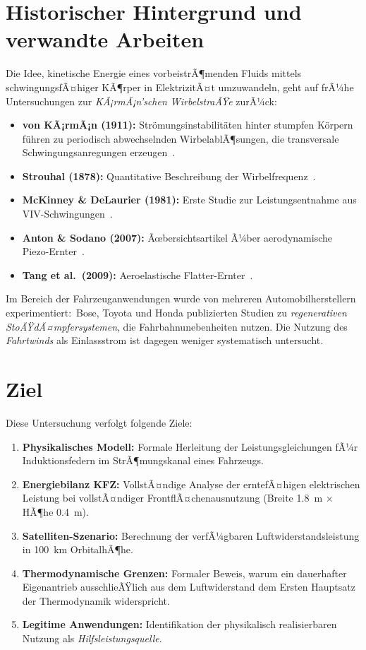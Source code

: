 ﻿\documentclass[12pt, a4paper]{report}
\theoremstyle{definition}
\theoremstyle{remark}
\begin{document}
\section{Historischer Hintergrund und verwandte Arbeiten}

Die Idee, kinetische Energie eines vorbeistrÃ¶menden Fluids mittels
schwingungsfÃ¤higer KÃ¶rper in ElektrizitÃ¤t umzuwandeln, geht auf frÃ¼he
Untersuchungen zur \emph{KÃ¡rmÃ¡n'schen WirbelstraÃŸe} zurÃ¼ck:

\begin{itemize}
  \item \textbf{von KÃ¡rmÃ¡n (1911):} Str\"omungsinstabilit\"aten hinter stumpfen
        K\"orpern f\"uhren zu periodisch abwechselnden WirbelablÃ¶sungen, die
        transversale Schwingungsanregungen erzeugen~\cite{karman1911}.
  \item \textbf{Strouhal (1878):} Quantitative Beschreibung der
        Wirbelfrequenz~\cite{strouhal1878}.
  \item \textbf{McKinney \& DeLaurier (1981):} Erste Studie zur Leistungsentnahme
        aus VIV-Schwingungen~\cite{mckinney1981}.
  \item \textbf{Anton \& Sodano (2007):} Ãœbersichtsartikel Ã¼ber aerodynamische
        Piezo-Ernter~\cite{anton2007}.
  \item \textbf{Tang et al.\ (2009):} Aeroelastische Flatter-Ernter~\cite{tang2009}.
\end{itemize}

Im Bereich der Fahrzeuganwendungen wurde von mehreren Automobilherstellern
experimentiert:\ Bose, Toyota und Honda publizierten Studien zu
\emph{regenerativen StoÃŸdÃ¤mpfersystemen}, die Fahrbahnunebenheiten nutzen.
Die Nutzung des \emph{Fahrtwinds} als Einlassstrom ist dagegen weniger
systematisch untersucht.

\section{Ziel}

Diese Untersuchung verfolgt folgende Ziele:

\begin{enumerate}[leftmargin=2em]
  \item \textbf{Physikalisches Modell:} Formale Herleitung der Leistungsgleichungen
        fÃ¼r Induktionsfedern im StrÃ¶mungskanal eines Fahrzeugs.
  \item \textbf{Energiebilanz KFZ:} VollstÃ¤ndige Analyse der erntefÃ¤higen
        elektrischen Leistung bei vollstÃ¤ndiger FrontflÃ¤chenausnutzung
        (Breite \SI{1.8}{\metre} $\times$ HÃ¶he \SI{0.4}{\metre}).
  \item \textbf{Satelliten-Szenario:} Berechnung der verfÃ¼gbaren
        Luftwiderstandsleistung in \SI{100}{\kilo\metre} OrbitalhÃ¶he.
  \item \textbf{Thermodynamische Grenzen:} Formaler Beweis, warum ein
        dauerhafter Eigenantrieb ausschlieÃŸlich aus dem Luftwiderstand
        dem Ersten Hauptsatz der Thermodynamik widerspricht.
  \item \textbf{Legitime Anwendungen:} Identifikation der physikalisch
        realisierbaren Nutzung als \emph{Hilfsleistungsquelle}.
\end{enumerate}
\end{document}
